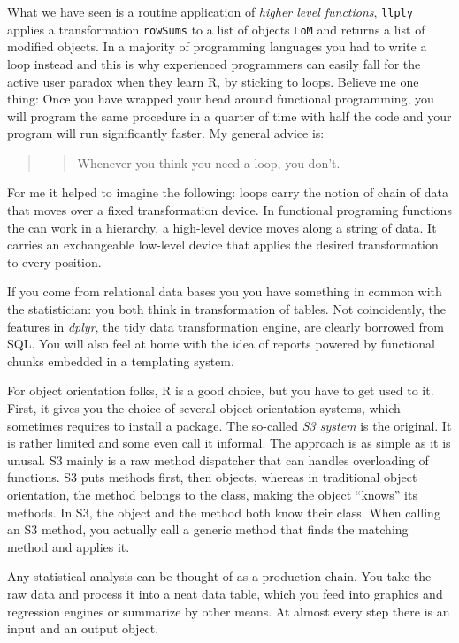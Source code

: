 \documentclass[]{svmono}
\begin{document}
What we have seen is a routine application of \emph{higher level
functions}, \texttt{llply} applies a transformation \texttt{rowSums} to
a list of objects \texttt{LoM} and returns a list of modified objects.
In a majority of programming languages you had to write a loop instead
and this is why experienced programmers can easily fall for the active
user paradox when they learn R, by sticking to loops. Believe me one
thing: Once you have wrapped your head around functional programming,
you will program the same procedure in a quarter of time with half the
code and your program will run significantly faster. My general advice
is:

\begin{quote}
\begin{quote}
Whenever you think you need a loop, you don't.
\end{quote}
\end{quote}

For me it helped to imagine the following: loops carry the notion of
chain of data that moves over a fixed transformation device. In
functional programing functions the can work in a hierarchy, a
high-level device moves along a string of data. It carries an
exchangeable low-level device that applies the desired transformation to
every position.

If you come from relational data bases you you have something in common
with the statistician: you both think in transformation of tables. Not
coincidently, the features in \emph{dplyr}, the tidy data transformation
engine, are clearly borrowed from SQL. You will also feel at home with
the idea of reports powered by functional chunks embedded in a
templating system.

For object orientation folks, R is a good choice, but you have to get
used to it. First, it gives you the choice of several object orientation
systems, which sometimes requires to install a package. The so-called
\emph{S3 system} is the original. It is rather limited and some even
call it informal. The approach is as simple as it is unusal. S3 mainly
is a raw method dispatcher that can handles overloading of functions. S3
puts methods first, then objects, whereas in traditional object
orientation, the method belongs to the class, making the object
``knows'' its methods. In S3, the object and the method both know their
class. When calling an S3 method, you actually call a generic method
that finds the matching method and applies it.

Any statistical analysis can be thought of as a production chain. You
take the raw data and process it into a neat data table, which you feed
into graphics and regression engines or summarize by other means. At
almost every step there is an input and an output object.
\end{document}
